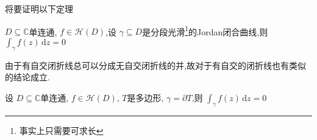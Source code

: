 \documentclass[../../复变函数.tex]{subfiles}
\begin{document}
将要证明以下定理
\begin{theorem}
    \(  D\subseteq \mathbb{C}   \)单连通, \(  f \in \mathcal{H}\left( D \right)   \),设 \(   \gamma \subseteq D  \)是分段光滑\footnote{事实上只需要可求长}的Jordan闭合曲线,则 \(  \int_{ \gamma }f\left( z \right)\,\mathrm{d} z= 0   \)    
\end{theorem}

\begin{remark}
    由于有自交闭折线总可以分成无自交闭折线的并,故对于有自交的闭折线也有类似的结论成立.
\end{remark}

\begin{lemma}
    设 \(  D\subseteq \mathbb{C}   \)单连通, \(  f\in \mathcal{H}\left( D \right)   \), \(  T  \)是多边形, \(   \gamma = \partial T  \),则 \(  \int_{ \gamma }f\left( z \right)\,\mathrm{d} z= 0   \)     
\end{lemma}
\end{document}

